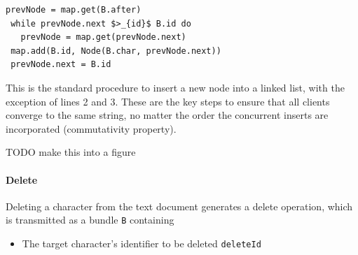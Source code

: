 \documentclass[12pt,a4paper,twoside,openright]{report}
\begin{document}
\begin{lstlisting}[mathescape=true,caption=Incorporating Insert Bundle into CRDT]
 prevNode = map.get(B.after)
 while prevNode.next $>_{id}$ B.id do
   prevNode = map.get(prevNode.next)
 map.add(B.id, Node(B.char, prevNode.next))
 prevNode.next = B.id
\end{lstlisting}
				
				This is the standard procedure to insert a new node into a linked list, with the exception of lines 2 and 3. These are the key steps to ensure that all clients converge to the same string, no matter the order the concurrent inserts are incorporated (commutativity property).
				
				
				TODO make this into a figure
				
			\paragraph{Delete}
				Deleting a character from the text document generates a delete operation, which is transmitted as a bundle \texttt{B} containing
				\begin{itemize}
					\item The target character's identifier to be deleted \texttt{deleteId}
				\end{itemize}
				
\end{document}
